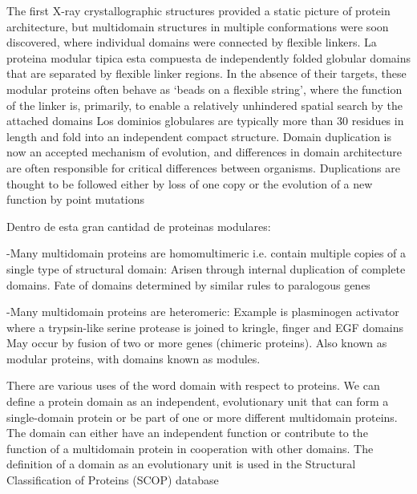 The first X-ray crystallographic structures provided a static picture of protein architecture, but multidomain structures in multiple conformations were soon discovered, where individual domains were connected by flexible linkers.
La proteina modular tipica esta compuesta de independently folded globular domains that are separated by flexible linker regions. 
In the absence of their targets, these modular proteins often behave as ‘beads on a flexible string’, where the function of the linker is, primarily, to enable a relatively unhindered spatial search by the attached domains
Los dominios globulares are typically more than 30 residues in length and fold into an independent compact structure. 
Domain duplication is now an accepted mechanism of evolution, and differences in domain architecture are often responsible for critical differences between organisms.
Duplications are thought to be followed either by loss of one copy or the evolution of a new function by point mutations


Dentro de esta gran cantidad de proteinas modulares:

-Many multidomain proteins are homomultimeric i.e. contain multiple copies of a single type of structural domain: Arisen through internal duplication of complete domains. Fate of domains determined by similar rules to paralogous genes

-Many multidomain proteins are heteromeric: Example is plasminogen activator where a trypsin-like serine protease is joined to kringle, finger and EGF domains
May occur by fusion of two or more genes (chimeric proteins). Also known as modular proteins, with domains known as modules. 




There are various uses of the word domain with respect to proteins. 
We can define a protein domain as an independent, evolutionary unit that can form a single-domain protein or be part of one or more different multidomain proteins. The domain can either have an independent
function or contribute to the function of a multidomain protein in cooperation with other domains. 
The definition of a domain as an evolutionary unit is used in the Structural Classification of Proteins (SCOP) database \cite{murzin1995scop}



